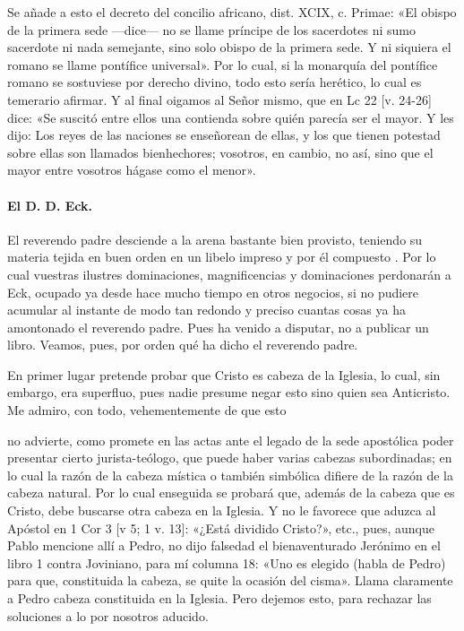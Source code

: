 Se añade a esto el decreto del concilio africano, dist. XCIX, c. Primae: «El obispo de la primera sede —dice— no se llame príncipe de los sacerdotes ni sumo sacerdote ni nada semejante, sino solo obispo de la primera sede. Y ni siquiera el romano se llame pontífice universal». Por lo cual, si la monarquía del pontífice romano se sostuviese por derecho divino, todo esto sería herético, lo cual es temerario afirmar. Y al final oigamos al Señor mismo, que en Lc 22 [v. 24-26] dice: «Se suscitó entre ellos una contienda sobre quién parecía ser el mayor. Y les dijo: Los reyes de las naciones se enseñorean de ellas, y los que tienen potestad sobre ellas son llamados bienhechores; vosotros, en cambio, no así, sino que el mayor entre vosotros hágase como el menor».

\paragraph*{El D. D. Eck.}

El reverendo padre desciende a la arena bastante bien provisto, teniendo su materia tejida en buen orden en un libelo impreso y por él compuesto \marginpar{\small[260]}. Por lo cual vuestras ilustres dominaciones, magnificencias y dominaciones perdonarán a Eck, ocupado ya desde hace mucho tiempo en otros negocios, si no pudiere acumular al instante de modo tan redondo y preciso cuantas cosas ya ha amontonado el reverendo padre. Pues ha venido a disputar, no a publicar un libro. Veamos, pues, por orden qué ha dicho el reverendo padre.

En primer lugar pretende probar que Cristo es cabeza de la Iglesia, lo cual, sin embargo, era superfluo, pues nadie presume negar esto sino quien sea Anticristo. Me admiro, con todo, vehementemente de que esto

no advierte, como promete en las actas ante el legado de la sede apostólica poder presentar cierto jurista-teólogo, que puede haber varias cabezas subordinadas; en lo cual la razón de la cabeza mística o también simbólica difiere de la razón de la cabeza natural. Por lo cual enseguida se probará que, además de la cabeza que es Cristo, debe buscarse otra cabeza en la Iglesia. Y no le favorece que aduzca al Apóstol en 1 Cor 3 [v 5; 1 v. 13]: «¿Está dividido Cristo?», etc., pues, aunque Pablo mencione allí a Pedro, no dijo falsedad el bienaventurado Jerónimo en el libro 1 contra Joviniano, para mí columna 18: «Uno es elegido (habla de Pedro) para que, constituida la cabeza, se quite la ocasión del cisma». Llama claramente a Pedro cabeza constituida en la Iglesia. Pero dejemos esto, para rechazar las soluciones a lo por nosotros aducido.

